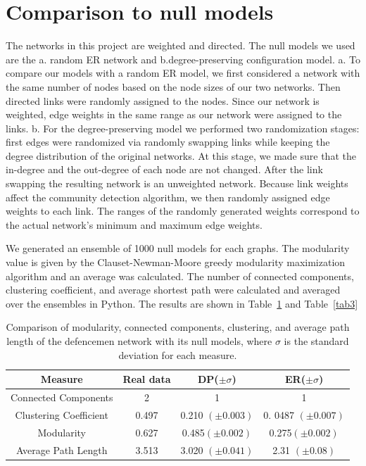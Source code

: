 \documentclass{article}
\begin{document}
\section{Comparison to null models}
The networks in this project are weighted and directed. The null models we used are the a. random ER network and b.degree-preserving configuration model. 
a. To compare our models with a random ER model, we first considered a network with the same number of nodes based on the node sizes of our two networks. Then directed links were randomly assigned to the nodes. Since our network is weighted, edge weights in the same range as our network were assigned to the links. 
b. For the degree-preserving model we performed two randomization stages: first edges were randomized via randomly swapping links while keeping the degree distribution of the original networks. At this stage, we made sure that the in-degree and the out-degree of each node are not changed. After the link swapping the resulting network is an unweighted network. Because link weights affect the community detection algorithm, we then randomly assigned edge weights to each link. The ranges of the randomly generated weights correspond to the actual network’s minimum and maximum edge weights. \par
We generated an ensemble of 1000 null models for each graphs. The modularity value is given by the Clauset-Newman-Moore greedy modularity maximization  algorithm and an average was calculated. The number of connected components, clustering coefficient, and average shortest path were calculated and averaged over the ensembles in Python. The results are shown in Table~\ref{tab2} and Table~\ref{tab3} \par
\begin{table}[H]
\centering %

\begin{tabular}{cccc}
\hline
Measure & Real data & DP($\pm \sigma$) & ER($\pm \sigma$)\\
\hline
Connected Components &  2 & 1 & 1\\
Clustering Coefficient & 0.497 & 0.210 $(\pm0.003)$ & 
0. 0487 $(\pm0.007)$\\
Modularity & 0.627 & 0.485$(\pm0.002)$ & 0.275$(\pm0.002)$\\
Average Path Length & 3.513 & 3.020 $(\pm0.041)$ & 2.31 $(\pm0.08)$ \\
\hline
\end{tabular}
\caption{Comparison of modularity, connected components, clustering, and average path length of the defencemen network with its null models, where $\sigma$ is the standard deviation for each measure.}\label{tab2}
\end{table}
\end{document}

